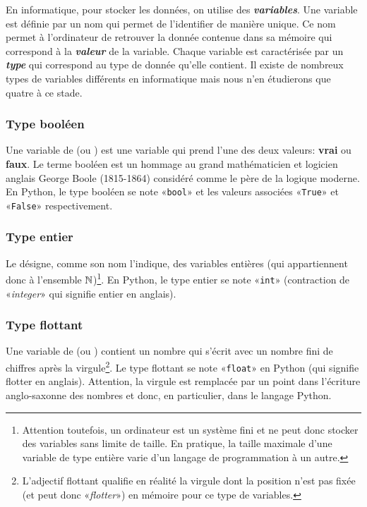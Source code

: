 En informatique, pour stocker les données, on utilise des \textit{\textbf{variables}}. Une variable est définie par un nom qui permet de l'identifier de manière unique. Ce nom permet à l'ordinateur de retrouver la donnée contenue dans sa mémoire qui correspond à la \textit{\textbf{valeur}} de la variable. Chaque variable est caractérisée par un \textit{\textbf{type}} qui correspond au type de donnée qu'elle contient. Il existe de nombreux types de variables différents en informatique mais nous n'en étudierons que quatre à ce stade.

\subsubsection{Type booléen}

Une variable de  (ou ) est une variable qui prend l'une des deux valeurs: {\ttfamily\bf vrai} ou {\ttfamily\bf faux}. Le terme booléen est un hommage au grand mathématicien et logicien anglais George Boole (1815-1864) considéré comme le père de la logique moderne. En Python, le type booléen se note «\texttt{bool}» et les valeurs associées «\texttt{True}» et «\texttt{False}» respectivement.

\subsubsection{Type entier}

Le  désigne, comme son nom l'indique, des variables entières (qui appartiennent donc à l'ensemble $\mathbb{N}$)\footnote{Attention toutefois, un ordinateur est un système fini et ne peut donc stocker des variables sans limite de taille. En pratique, la taille maximale d'une variable de type entière varie d'un langage de programmation à un autre.}. En Python, le type entier se note «\texttt{int}» (contraction de «\textit{integer}» qui signifie entier en anglais).

\subsubsection{Type flottant}

Une variable de  (ou ) contient un nombre qui s'écrit avec un nombre fini de chiffres après la virgule\footnote{L'adjectif flottant qualifie en réalité la virgule dont la position n'est pas fixée (et peut donc «\textit{flotter}») en mémoire pour ce type de variables.}. Le type flottant se note «\texttt{float}» en Python (qui signifie flotter en anglais). Attention, la virgule est remplacée par un point dans l'écriture anglo-saxonne des nombres et donc, en particulier, dans le langage Python.

